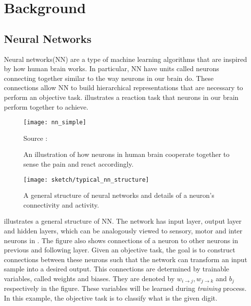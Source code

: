 \chapter{Background}\label{cha:chapter3}

\section{Neural Networks}
Neural networks(NN) are a type of machine learning algorithms that are inspired by how human brain works.  In particular, NN have units called neurons connecting together similar to the way neurons in our brain do. These connections allow NN to build hierarchical representations that are necessary to perform an objective task. \addfigure{\ref{fig:nn_simple}} illustrates a reaction task that neurons in our brain perform together to achieve.

 \begin{figure}[ht!]
    \begin{center}

\texttt{[image: nn\_simple]}
\caption{An illustration of how neurons in human brain cooperate together to sense the pain and react accordingly.}
\small{Source : \cite{LeonMakingSimpleNeural2017}}
\label{fig:nn_simple}

\end{center}
\end{figure}

 \begin{figure}[ht!]
    \begin{center}

\texttt{[image: sketch/typical\_nn\_structure]}
\caption[]{A general structure of neural networks and details of a neuron's connectivity and activity.}
\label{fig:nn_typical_structure}

\end{center}
\end{figure}


%


\addfigure{\ref{fig:nn_typical_structure}} illustrates a general structure of NN. The network has input layer, output layer and hidden layers, which can be analogously viewed to sensory, motor and inter neurons in \addfigure{\ref{fig:nn_simple}}. The figure also shows connections of a neuron to other neurons in previous and following layer. Given an objective task, the goal is to construct connections between these neurons such that the network can transform an input sample into a desired output.  This connections are determined by trainable variables, called weights and biases. They are denoted by $w_{i\rightarrow j}, w_{j\rightarrow k}$ and $b_j$ respectively in the figure. These variables will be learned  during \textit{training} process.  In this example, the objective task is to classify what is the given digit.


